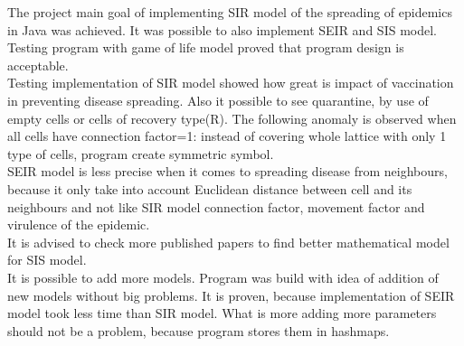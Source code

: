\documentclass[a4paper, 11pt]{article}
\begin{document}
The project main goal of implementing SIR model of the spreading of epidemics in Java was achieved. It was possible to also implement SEIR and SIS model. Testing program with game of life model proved that program design is acceptable.\\

Testing implementation of SIR model showed how great is impact of vaccination in preventing disease spreading. Also it possible to see quarantine, by use of empty cells or cells of recovery type(R). The following anomaly is observed when all cells have connection factor=1: instead of covering whole lattice with only 1 type of cells, program create symmetric symbol.\\

SEIR model is less precise when it comes to spreading disease from neighbours, because it only take into account Euclidean distance between cell and its neighbours and not like SIR model connection factor, movement factor and virulence of the epidemic.\\

It is advised to check more published papers to find better mathematical model for SIS model.\\

It is possible to add more models. Program was build with idea of addition of new models without big problems. It is proven, because implementation of SEIR model took less time than SIR model. What is more adding more parameters should not be a problem, because program stores them in hashmaps.
%
\printbibliography
\end{document}
